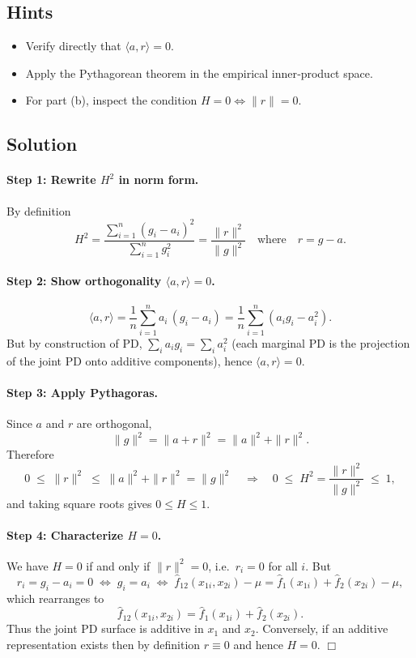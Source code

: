 \documentclass[a4paper]{article}
\begin{document}
\subsection*{Hints}
\begin{itemize}
  \item Verify directly that \(\langle a,r\rangle=0\).
  \item Apply the Pythagorean theorem in the empirical inner‐product space.
  \item For part (b), inspect the condition \(H=0\iff \|r\|=0\).
\end{itemize}

\subsection*{Solution}

\paragraph{Step 1: Rewrite \(H^2\) in norm form.}
By definition
\[
H^2
= \frac{\sum_{i=1}^n (g_i - a_i)^2}{\sum_{i=1}^n g_i^2}
= \frac{\|r\|^2}{\|g\|^2}
\quad\text{where}\quad
r = g - a.
\]

\paragraph{Step 2: Show orthogonality \(\langle a,r\rangle=0\).}
\[
\langle a,r\rangle
= \frac1n\sum_{i=1}^n a_i\,(g_i - a_i)
= \frac1n\sum_{i=1}^n (a_i g_i - a_i^2).
\]
But by construction of PD,
\(\sum_i a_i g_i = \sum_i a_i^2\) (each marginal PD is the projection of the joint PD onto additive components), hence
\(\langle a,r\rangle=0\).

\paragraph{Step 3: Apply Pythagoras.}
Since \(a\) and \(r\) are orthogonal,
\[
\|g\|^2 = \|a + r\|^2 = \|a\|^2 + \|r\|^2.
\]
Therefore
\[
0 \;\le\;\|r\|^2 \;\le\;\|a\|^2 + \|r\|^2 = \|g\|^2
\quad\Longrightarrow\quad
0 \;\le\; H^2 = \frac{\|r\|^2}{\|g\|^2} \;\le\;1,
\]
and taking square roots gives \(0\le H\le 1\).

\paragraph{Step 4: Characterize \(H=0\).}
We have \(H=0\) if and only if \(\|r\|^2=0\), i.e.\ \(r_i=0\) for all \(i\).  But
\[
r_i = g_i - a_i = 0
\;\Longleftrightarrow\;
g_i = a_i
\;\Longleftrightarrow\;
\hat f_{12}(x_{1i},x_{2i}) - \mu
= \hat f_{1}(x_{1i}) + \hat f_{2}(x_{2i}) - \mu,
\]
which rearranges to
\[
\hat f_{12}(x_{1i},x_{2i})
= \hat f_{1}(x_{1i}) + \hat f_{2}(x_{2i}).
\]
Thus the joint PD surface is additive in \(x_1\) and \(x_2\).  Conversely, if an additive representation exists then by definition \(r\equiv0\) and hence \(H=0\).  \hfill\(\Box\)
\end{document}
